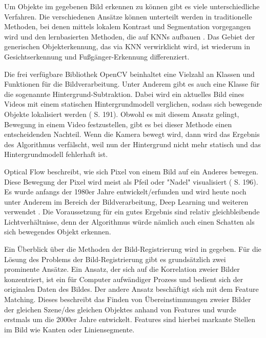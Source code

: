 Um Objekte im gegebenen Bild erkennen zu können gibt es viele unterschiedliche Verfahren. Die verschiedenen Ansätze können unterteilt werden in traditionelle Methoden, bei denen mittels lokalem Kontrast und Segmentation vorgegangen wird und den lernbasierten Methoden, die auf KNNs aufbauen \cite{ObjectDetectionReview}. Das Gebiet der generischen Objekterkennung, das via KNN verwirklicht wird, ist wiederum in Gesichtserkennung und Fußgänger-Erkennung differenziert. \par
Die frei verfügbare Bibliothek OpenCV \cite{OpenCV} beinhaltet eine Vielzahl an Klassen und Funktionen für die Bildverarbeitung. Unter Anderem gibt es auch eine Klasse für die sogenannte Hintergrund-Subtraktion. Dabei wird ein aktuelles Bild eines Videos mit einem statischen Hintergrundmodell verglichen, sodass sich bewegende Objekte lokalisiert werden (\cite{ComputerVisionOpenCVBook} S. 191). Obwohl es mit diesem Ansatz gelingt, Bewegung in einem Video festzustellen, gibt es bei dieser Methode einen entscheidenden Nachteil. Wenn die Kamera bewegt wird, dann wird das Ergebnis des Algorithmus verfälscht, weil nun der Hintergrund nicht mehr statisch und das Hintergrundmodell fehlerhaft ist. \par
Optical Flow beschreibt, wie sich Pixel von einem Bild auf ein Anderes bewegen. Diese Bewegung der Pixel wird meist als Pfeil oder "Nadel" visualisiert (\cite{ComputerVisionOpenCVBook} S. 196). Es wurde anfangs der 1980er Jahre entwickelt/erfunden und wird heute noch unter Anderem im Bereich der Bildverarbeitung, Deep Learning und weiteren verwendet \cite{OpticalFlow1980}. Die Voraussetzung für ein gutes Ergebnis sind relativ gleichbleibende Lichtverhältnisse, denn der Algorithmus würde nämlich auch einen Schatten als sich bewegendes Objekt erkennen. \par
Ein Überblick über die Methoden der Bild-Registrierung wird in \cite{FeatureMatchingArticleEfficientAlgorithmsFor} gegeben. Für die Lösung des Problems der Bild-Registrierung gibt es grundsätzlich zwei prominente Ansätze. Ein Ansatz, der sich auf die Korrelation zweier Bilder konzentriert, ist ein für Computer aufwändiger Prozess und bedient sich der originalen Daten des Bildes. Der andere Ansatz beschäftigt sich mit dem Feature Matching. Dieses beschreibt das Finden von Übereinstimmungen zweier Bilder der gleichen Szene/des gleichen Objektes anhand von Features und wurde erstmals um die 2000er Jahre entwickelt. Features sind hierbei markante Stellen im Bild wie Kanten oder Liniensegmente. \par
